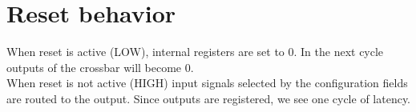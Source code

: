 \section{Reset behavior}

When reset is active (LOW), internal registers are set to 0. In the next cycle outputs of the crossbar will become 0.\\
When reset is not active (HIGH) input signals selected by the configuration fields are routed to the output. Since outputs are registered, we see one cycle of latency.




